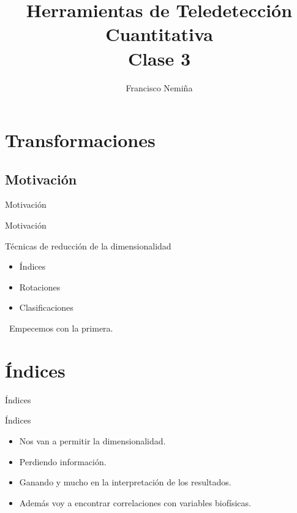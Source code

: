 \documentclass[]{beamer}
\title{Herramientas de Teledetección Cuantitativa\\{\small Clase 3}}
\author{Francisco Nemiña}
\institute{Unidad de Educación y Formación Masiva \\ Comisión Nacional de
Actividades Espaciales}
\date{}
\begin{document}
\begin{frame}
    \maketitle
\end{frame}

\section{Transformaciones}
\subsection{Motivación}

\begin{frame}{Motivación}
  \begin{center}
    \end{center}
\end{frame}

\begin{frame}{Motivación}
  \begin{block}{Técnicas de reducción de la dimensionalidad}
    \begin{itemize}[<+>]
      \item Índices
      \item Rotaciones
      \item Clasificaciones
    \end{itemize}
    \pause\
    Empecemos con la primera.
  \end{block}
\end{frame}

\section{Índices}

\begin{frame}{Índices}
  \begin{block}{Índices}
    \begin{itemize}[<+>]
      \item Nos van a permitir la dimensionalidad.
      \item Perdiendo información.
      \item Ganando y mucho en la interpretación de los resultados.
      \item Además voy a encontrar correlaciones con variables biofísicas.
    \end{itemize}
  \end{block}
\end{frame}
\end{document}
